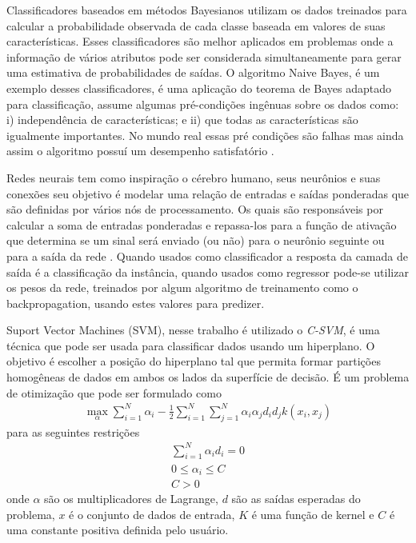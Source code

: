 \documentclass{acm_proc_article-sp}
\begin{document}
Classificadores baseados em m{\'e}todos Bayesianos utilizam os dados treinados para calcular a probabilidade observada de cada classe baseada em valores de suas caracter{\'i}sticas. Esses classificadores s{\~a}o melhor aplicados em problemas onde a informa\c{c}{\~a}o de v{\'a}rios atributos pode ser considerada simultaneamente para gerar uma estimativa de probabilidades de sa{\'i}das. O algoritmo Naive Bayes, {\'e} um exemplo desses classificadores, {\'e} uma aplica\c{c}{\~a}o do teorema de Bayes adaptado para classifica\c{c}{\~a}o, assume algumas pr{\'e}-condi\c{c}{\~o}es ing{\^e}nuas sobre os dados como: i) independ{\^e}ncia de caracter{\'i}sticas; e ii) que todas as caracter{\'i}sticas s{\~a}o igualmente importantes. No mundo real essas pr{\'e} condi\c{c}{\~o}es s{\~a}o falhas mas ainda assim o algoritmo possu{\'i} um desempenho satisfat{\'o}rio \cite{MachineLearningwithR2013}.


Redes neurais tem como inspira\c{c}{\~a}o o c{\'e}rebro humano, seus neur{\^o}nios e suas conex{\~o}es seu objetivo {\'e} modelar uma rela\c{c}{\~a}o de entradas e sa{\'i}das ponderadas que s{\~a}o definidas por v{\'a}rios n{\'o}s de processamento. Os quais s{\~a}o respons{\'a}veis por calcular a soma de entradas ponderadas e repassa-los para a fun\c{c}{\~a}o de ativa\c{c}{\~a}o que determina se um sinal ser{\'a} enviado (ou n{\~a}o) para o neur{\^o}nio seguinte ou para a sa{\'i}da da rede \cite{Haykin2007}.  Quando usados como classificador a resposta da camada de sa{\'i}da {\'e} a classifica\c{c}{\~a}o da inst{\^a}ncia, quando usados como regressor pode-se utilizar os pesos da rede, treinados por algum algoritmo de treinamento como o backpropagation, usando estes valores para predizer.

Suport Vector Machines (SVM), nesse trabalho {\'e} utilizado o \emph{C-SVM}, {\'e} uma t{\'e}cnica que pode ser usada para classificar dados usando um hiperplano. O objetivo {\'e} escolher a posi\c{c}{\~a}o do hiperplano tal que permita formar parti\c{c}{\~o}es homog{\^e}neas de dados em ambos os lados da superf{\'i}cie de decis{\~a}o. {\'E} um problema de otimiza\c{c}{\~a}o que pode ser formulado \cite{Haykin2007} como 
\begin{align}
\max_{\alpha} \sum\limits_{i=1}^{N} \alpha_{i} - \frac{1}{2} \sum\limits_{i=1}^{N} \sum\limits_{j=1}^{N} \alpha_{i}\alpha_{j}d_{i}d_{j}k(x_{i},x_{j})
\end{align}
para as seguintes restri\c{c}{\~o}es
\begin{align}
\sum\limits_{i=1}^{N} \alpha_{i}d_{i} = 0 \\
0 \leq \alpha_{i} \leq C \\
C > 0
\end{align}
onde \(\alpha\) s{\~a}o os multiplicadores de Lagrange, \(d\) s{\~a}o as sa{\'i}das esperadas do problema, \(x\) {\'e} o conjunto de dados de entrada, \(K\) {\'e} uma fun\c{c}{\~a}o de kernel e \(C\) {\'e} uma constante positiva definida pelo usu{\'a}rio.
\end{document}
